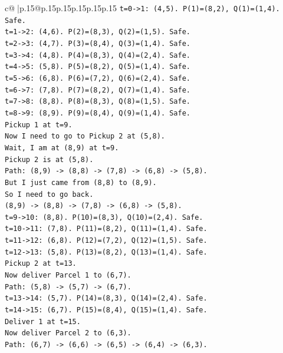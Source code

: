 \documentclass{article}
\begin{document}
{\begin{supertabular}{c@{$\;$}|p{.15\linewidth}@{}p{.15\linewidth}p{.15\linewidth}p{.15\linewidth}p{.15\linewidth}p{.15\linewidth}}
{{{\texttt{t=0{-}>1: (4,5). P(1)=(8,2), Q(1)=(1,4). Safe.} \\
\texttt{t=1{-}>2: (4,6). P(2)=(8,3), Q(2)=(1,5). Safe.} \\
\texttt{t=2{-}>3: (4,7). P(3)=(8,4), Q(3)=(1,4). Safe.} \\
\texttt{t=3{-}>4: (4,8). P(4)=(8,3), Q(4)=(2,4). Safe.} \\
\texttt{t=4{-}>5: (5,8). P(5)=(8,2), Q(5)=(1,4). Safe.} \\
\texttt{t=5{-}>6: (6,8). P(6)=(7,2), Q(6)=(2,4). Safe.} \\
\texttt{t=6{-}>7: (7,8). P(7)=(8,2), Q(7)=(1,4). Safe.} \\
\texttt{t=7{-}>8: (8,8). P(8)=(8,3), Q(8)=(1,5). Safe.} \\
\texttt{t=8{-}>9: (8,9). P(9)=(8,4), Q(9)=(1,4). Safe.} \\
\texttt{Pickup 1 at t=9.} \\
\texttt{Now I need to go to Pickup 2 at (5,8).} \\
\texttt{Wait, I am at (8,9) at t=9.} \\
\texttt{Pickup 2 is at (5,8).} \\
\texttt{Path: (8,9) {-}> (8,8) {-}> (7,8) {-}> (6,8) {-}> (5,8).} \\
\texttt{But I just came from (8,8) to (8,9).} \\
\texttt{So I need to go back.} \\
\texttt{(8,9) {-}> (8,8) {-}> (7,8) {-}> (6,8) {-}> (5,8).} \\
\texttt{t=9{-}>10: (8,8). P(10)=(8,3), Q(10)=(2,4). Safe.} \\
\texttt{t=10{-}>11: (7,8). P(11)=(8,2), Q(11)=(1,4). Safe.} \\
\texttt{t=11{-}>12: (6,8). P(12)=(7,2), Q(12)=(1,5). Safe.} \\
\texttt{t=12{-}>13: (5,8). P(13)=(8,2), Q(13)=(1,4). Safe.} \\
\texttt{Pickup 2 at t=13.} \\
\texttt{Now deliver Parcel 1 to (6,7).} \\
\texttt{Path: (5,8) {-}> (5,7) {-}> (6,7).} \\
\texttt{t=13{-}>14: (5,7). P(14)=(8,3), Q(14)=(2,4). Safe.} \\
\texttt{t=14{-}>15: (6,7). P(15)=(8,4), Q(15)=(1,4). Safe.} \\
\texttt{Deliver 1 at t=15.} \\
\texttt{Now deliver Parcel 2 to (6,3).} \\
\texttt{Path: (6,7) {-}> (6,6) {-}> (6,5) {-}> (6,4) {-}> (6,3).} \\
}}}
\end{supertabular}}
\end{document}
